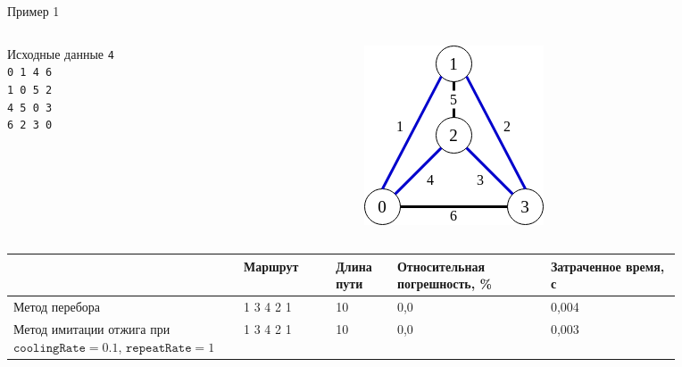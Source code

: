 \documentclass[ignoreonframetext,unicode]{beamer}
\begin{document}
\begin{frame}{Пример 1}
	\begin{columns}
		\begin{column}{0.3\textwidth}
		\begin{block}{Исходные данные}
		\texttt{4\\
				0 1 4 6\\
				1 0 5 2\\
				4 5 0 3\\
				6 2 3 0}
		\end{block}
		\end{column}
		\begin{column}{0.3\textwidth}
			\begin{figure}[!h]
				\begin{center}
					\includegraphics[scale=0.4]{Test2-1}
				\end{center}
			\end{figure}
		\end{column}
	\end{columns}	
	
\begin{table}[h]
	\begin{center}
		\small{
		\begin{tabular}{|p{0.3\linewidth}|p{0.12\linewidth}|p{0.08\linewidth}|p{0.2\linewidth}|p{0.17\linewidth}|} \hline
			& Маршрут & Длина пути & Относительная погрешность, \% & Затраченное время, с\\ \hline
			Метод перебора & 1 3 4 2 1 & 10 & 0,0 & 0,004 \\
			\hline
			Метод имитации отжига при {$\texttt{coolingRate}=0.1$}, $\texttt{repeatRate}=1$ & 1 3 4 2 1 & 10 & 0,0 & 0,003 \\
			\hline
		\end{tabular}\\
	}
	\end{center}
\end{table}

\end{frame}
\end{document}
